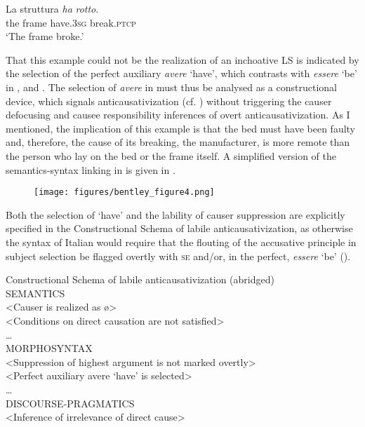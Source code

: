 \documentclass[output=paper,colorlinks,citecolor=brown
]{langscibook}
\begin{document}
\ea \label{bentley_example_59}
\gll La		struttura	\textit{ha}						\textit{rotto}. \\
			the		frame				have.3\textsc{sg}	break.\textsc{ptcp}	\\
\glt 			‘The frame broke.’
\z

That this example could not be the realization of an inchoative LS is indicated by the selection of the perfect auxiliary \textit{avere} ‘have’, which contrasts with \textit{essere} ‘be’ in ,  and . The selection of \textit{avere} in  must thus be analysed as a constructional device, which signals anticausativization (cf. ) without triggering the causer defocusing and causee responsibility inferences of overt anticausativization. As I mentioned, the implication of this example is that the bed must have been faulty and, therefore, the cause of its breaking, the manufacturer, is more remote than the person who lay on the bed or the frame itself. A simplified version of the semantics-syntax linking in  is given in .

\begin{figure}
\centering
\texttt{[image: figures/bentley\_figure4.png]}
\caption{}
\label{fig:bentley_figure_4}
\end{figure}    

Both the selection of ‘have’ and the lability of causer suppression are explicitly specified in the Constructional Schema of labile anticausativization, as otherwise the syntax of Italian would require that the flouting of the accusative principle in subject selection be flagged overtly with \textsc{se} and/or, in the perfect, \textit{essere} ‘be’ ().

\ea  \label{bentley_example_60}
Constructional Schema of labile anticausativization (abridged)\\
SEMANTICS\\
<Causer is realized as \o>\\
<Conditions on direct causation are not satisfied>\\
 \ldots \\
MORPHOSYNTAX\\
<Suppression of highest argument is not marked overtly>\\
<Perfect auxiliary avere ‘have’ is selected>\\
 \ldots \\
DISCOURSE-PRAGMATICS\\
<Inference of irrelevance of direct cause>
\z
\end{document}
